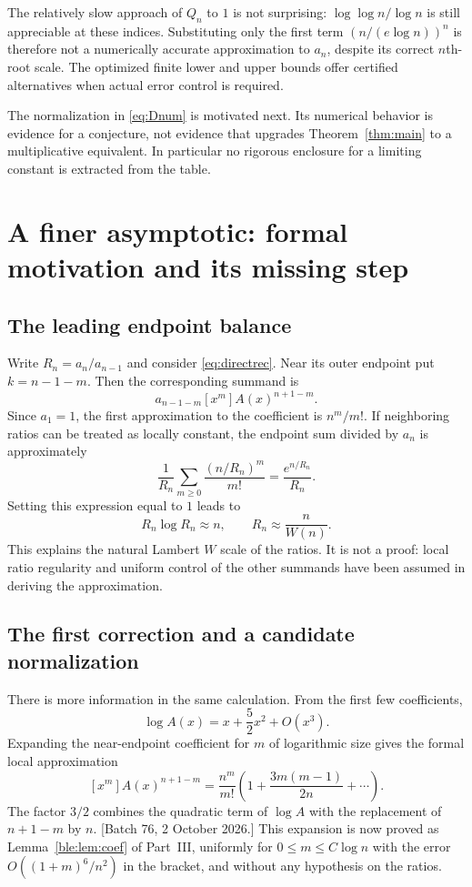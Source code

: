 \documentclass[11pt]{article}
\numberwithin{equation}{section}
\theoremstyle{definition}
\theoremstyle{remark}
\begin{document}


The relatively slow approach of $Q_n$ to $1$ is not surprising:
$\log\log n/\log n$ is still appreciable at these indices. Substituting
only the first term $(n/(e\log n))^n$ is therefore not a numerically
accurate approximation to $a_n$, despite its correct $n$th-root scale.
The optimized finite lower and upper bounds offer certified alternatives
when actual error control is required.

The normalization in \eqref{eq:Dnum} is motivated next. Its numerical
behavior is evidence for a conjecture, not evidence that upgrades
Theorem~\ref{thm:main} to a multiplicative equivalent. In particular no
rigorous enclosure for a limiting constant is extracted from the table.

\section{A finer asymptotic: formal motivation and its missing step}\label{sec:finer}

\subsection{The leading endpoint balance}

Write $R_n=a_n/a_{n-1}$ and consider \eqref{eq:directrec}. Near its outer
endpoint put $k=n-1-m$. Then the corresponding summand is
\[
 a_{n-1-m}[x^m]A(x)^{n+1-m}.
\]
Since $a_1=1$, the first approximation to the coefficient is $n^m/m!$.
If neighboring ratios can be treated as locally constant, the endpoint
sum divided by $a_n$ is approximately
\[
 \frac1{R_n}\sum_{m\ge0}\frac{(n/R_n)^m}{m!}
 =\frac{e^{n/R_n}}{R_n}.
\]
Setting this expression equal to $1$ leads to
\[
 R_n\log R_n\approx n,
 \qquad R_n\approx\frac n{W(n)}.
\]
This explains the natural Lambert $W$ scale of the ratios. It is not a
proof: local ratio regularity and uniform control of the other summands
have been assumed in deriving the approximation.

\subsection{The first correction and a candidate normalization}

There is more information in the same calculation. From the first few
coefficients,
\[
 \log A(x)=x+\frac52x^2+O(x^3).
\]
Expanding the near-endpoint coefficient for $m$ of logarithmic size gives
the formal local approximation
\begin{equation}\label{eq:localcoeff}
 [x^m]A(x)^{n+1-m}
 =\frac{n^m}{m!}
  \left(1+\frac{3m(m-1)}{2n}+\cdots\right).
\end{equation}
The factor $3/2$ combines the quadratic term of $\log A$ with the
replacement of $n+1-m$ by $n$. [Batch 76, 2 October 2026.] This
expansion is now proved as Lemma~\ref{ble:lem:coef} of Part~III,
uniformly for $0\le m\le C\log n$ with the error
$O((1+m)^6/n^2)$ in the bracket, and without any hypothesis on the
ratios.
\end{document}
